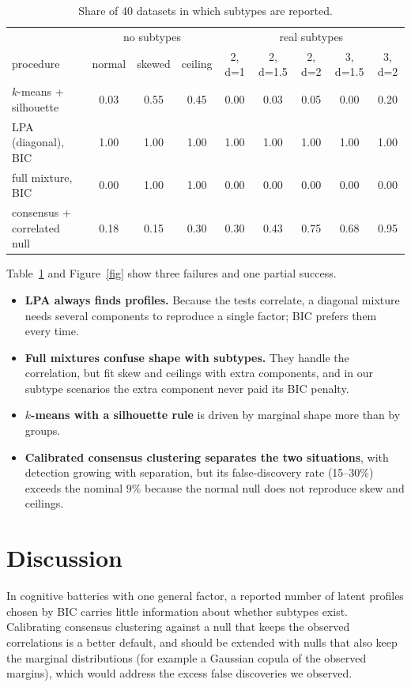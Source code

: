 \documentclass[11pt]{article}
\begin{document}
\begin{table}[h]
\centering
\begin{tabular}{lccc|ccccc}
\toprule
 & \multicolumn{3}{c|}{no subtypes} & \multicolumn{5}{c}{real subtypes} \\
procedure & normal & skewed & ceiling & 2, d=1 & 2, d=1.5 & 2, d=2 & 3, d=1.5 & 3, d=2 \\
\midrule
$k$-means + silhouette & 0.03 & 0.55 & 0.45 & 0.00 & 0.03 & 0.05 & 0.00 & 0.20 \\
LPA (diagonal), BIC & 1.00 & 1.00 & 1.00 & 1.00 & 1.00 & 1.00 & 1.00 & 1.00 \\
full mixture, BIC & 0.00 & 1.00 & 1.00 & 0.00 & 0.00 & 0.00 & 0.00 & 0.00 \\
consensus + correlated null & 0.18 & 0.15 & 0.30 & 0.30 & 0.43 & 0.75 & 0.68 & 0.95 \\
\bottomrule
\end{tabular}
\caption{Share of 40 datasets in which subtypes are reported.}
\label{tab}
\end{table}

Table~\ref{tab} and Figure~\ref{fig} show three failures and one partial success.
\begin{itemize}
\item \textbf{LPA always finds profiles.} Because the tests correlate, a diagonal mixture needs several components
to reproduce a single factor; BIC prefers them every time.
\item \textbf{Full mixtures confuse shape with subtypes.} They handle the correlation, but fit skew and ceilings with
extra components, and in our subtype scenarios the extra component never paid its BIC penalty.
\item \textbf{$k$-means with a silhouette rule} is driven by marginal shape more than by groups.
\item \textbf{Calibrated consensus clustering separates the two situations}, with detection growing with separation,
but its false-discovery rate (15--30\%) exceeds the nominal 9\% because the normal null does not reproduce skew and
ceilings.
\end{itemize}

\section{Discussion}
In cognitive batteries with one general factor, a reported number of latent profiles chosen by BIC carries little
information about whether subtypes exist. Calibrating consensus clustering against a null that keeps the observed
correlations is a better default, and should be extended with nulls that also keep the marginal distributions (for
example a Gaussian copula of the observed margins), which would address the excess false discoveries we observed.
\end{document}

